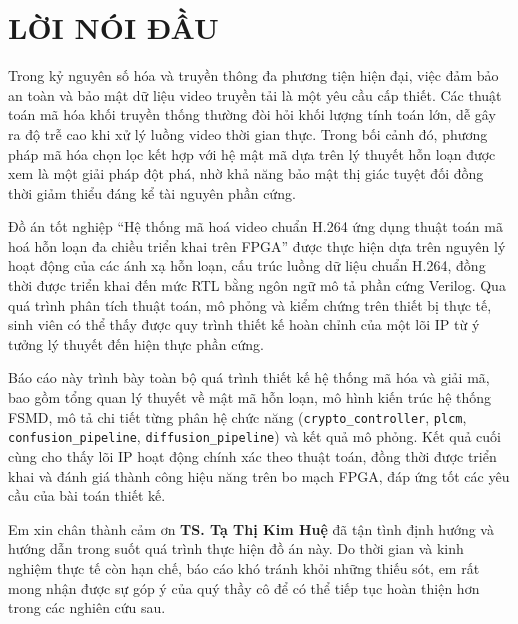\section*{LỜI NÓI ĐẦU}

Trong kỷ nguyên số hóa và truyền thông đa phương tiện hiện đại, việc đảm bảo an toàn và bảo mật dữ liệu video truyền tải là một yêu cầu cấp thiết. Các thuật toán mã hóa khối truyền thống thường đòi hỏi khối lượng tính toán lớn, dễ gây ra độ trễ cao khi xử lý luồng video thời gian thực. Trong bối cảnh đó, phương pháp mã hóa chọn lọc kết hợp với hệ mật mã dựa trên lý thuyết hỗn loạn được xem là một giải pháp đột phá, nhờ khả năng bảo mật thị giác tuyệt đối đồng thời giảm thiểu đáng kể tài nguyên phần cứng.

Đồ án tốt nghiệp “Hệ thống mã hoá video chuẩn H.264 ứng dụng thuật toán mã hoá hỗn loạn đa chiều triển khai trên FPGA” được thực hiện dựa trên nguyên lý hoạt động của các ánh xạ hỗn loạn, cấu trúc luồng dữ liệu chuẩn H.264, đồng thời được triển khai đến mức RTL bằng ngôn ngữ mô tả phần cứng Verilog. Qua quá trình phân tích thuật toán, mô phỏng và kiểm chứng trên thiết bị thực tế, sinh viên có thể thấy được quy trình thiết kế hoàn chỉnh của một lõi IP từ ý tưởng lý thuyết đến hiện thực phần cứng.

Báo cáo này trình bày toàn bộ quá trình thiết kế hệ thống mã hóa và giải mã, bao gồm tổng quan lý thuyết về mật mã hỗn loạn, mô hình kiến trúc hệ thống FSMD, mô tả chi tiết từng phân hệ chức năng (\texttt{crypto\_controller}, \texttt{plcm}, \texttt{confusion\_pipeline}, \texttt{diffusion\_pipeline}) và kết quả mô phỏng. Kết quả cuối cùng cho thấy lõi IP hoạt động chính xác theo thuật toán, đồng thời được triển khai và đánh giá thành công hiệu năng trên bo mạch FPGA, đáp ứng tốt các yêu cầu của bài toán thiết kế.

Em xin chân thành cảm ơn \textbf{TS. Tạ Thị Kim Huệ} đã tận tình định hướng và hướng dẫn trong suốt quá trình thực hiện đồ án này. Do thời gian và kinh nghiệm thực tế còn hạn chế, báo cáo khó tránh khỏi những thiếu sót, em rất mong nhận được sự góp ý của quý thầy cô để có thể tiếp tục hoàn thiện hơn trong các nghiên cứu sau.

\clearpage